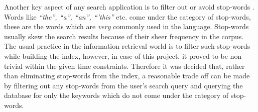 \documentclass[letterpaper,twocolumn,10pt]{article}
\begin{document}
Another key aspect of any search application is to filter out or avoid stop-words
. Words like \textit{``the'', ``a'', ``an'', ``'this''} etc. come under the
category of stop-words, these are the words which are \emph{very} commonly used
in the
language. Stop-words usually skew the search results because of their sheer
frequency in the corpus. The usual practice in the information retrieval world
is to filter such stop-words while building the index, however, in case of this
project, it proved to be non-trivial within the given time constraints.
Therefore it was decided that, rather than eliminating stop-words from the index,
a reasonable trade off can be made by filtering out any stop-words from the
user's search query and querying the database for only the keywords which do
not come under the category of stop-words. \\
\end{document}
